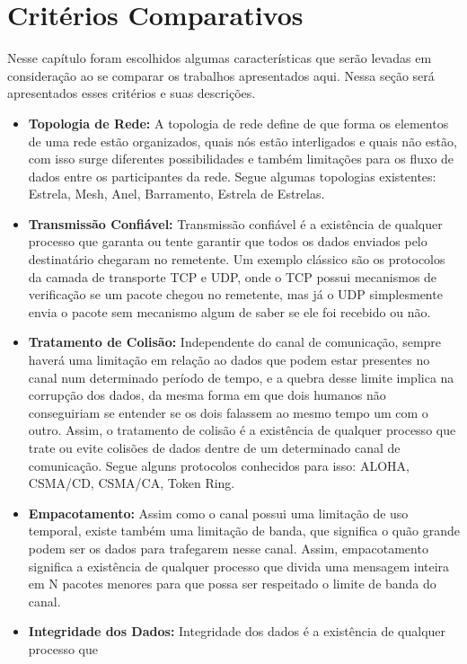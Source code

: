\newpage

\section{Critérios Comparativos}

Nesse capítulo foram escolhidos algumas características que serão levadas em consideração ao se comparar os trabalhos apresentados aqui. Nessa seção será apresentados esses critérios e suas descrições.

\begin{itemize}
    \item \textbf{Topologia de Rede:} A topologia de rede define de que forma os elementos de uma rede
    estão organizados, quais nós estão interligados e quais não estão, com isso surge diferentes possibilidades e também limitações para os fluxo de dados entre os participantes da rede. Segue algumas topologias existentes: Estrela, Mesh, Anel, Barramento, Estrela de Estrelas.
    \item \textbf{Transmissão Confiável:} Transmissão confiável é a existência de qualquer processo que
    garanta ou tente garantir que todos os dados enviados pelo destinatário chegaram no remetente. Um exemplo clássico são os protocolos da camada de transporte TCP e UDP, onde o TCP possui mecanismos de verificação se um pacote chegou no remetente, mas já o UDP simplesmente envia o pacote sem mecanismo algum de saber se ele foi recebido ou não.
    \item \textbf{Tratamento de Colisão:} Independente do canal de comunicação, sempre haverá uma limitação em relação ao dados que podem estar presentes no canal num determinado período de tempo, e a quebra
    desse limite implica na corrupção dos dados, da mesma forma em que dois humanos não conseguiriam se entender se os dois falassem ao mesmo tempo um com o outro. Assim, o tratamento de colisão é a existência de qualquer processo que trate ou evite colisões de dados dentre de um determinado canal
    de comunicação. Segue alguns protocolos conhecidos para isso: ALOHA, CSMA/CD, CSMA/CA, Token Ring.
    \item \textbf{Empacotamento:} Assim como o canal possui uma limitação de uso temporal, existe também
    uma limitação de banda, que significa o quão grande podem ser os dados para trafegarem nesse canal. Assim, empacotamento significa a existência de qualquer processo que divida uma mensagem inteira em N pacotes menores para que possa ser respeitado o limite de banda do canal.
    \item \textbf{Integridade dos Dados:} Integridade dos dados é a existência de qualquer processo que

\end{itemize}
